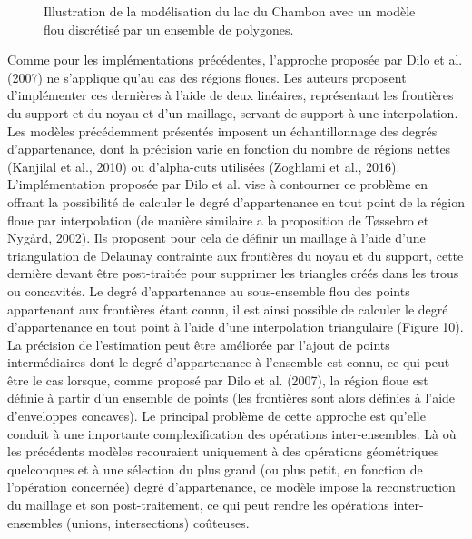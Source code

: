 \begin{figure}
  \centering
  \caption{Illustration de la modélisation du lac du Chambon avec un modèle flou discrétisé par un ensemble de polygones.}
  \label{fig:champ_polygones}
\end{figure}

Comme pour les implémentations précédentes, l’approche proposée par
Dilo et al. (2007) ne s’applique qu’au cas des régions floues. Les
auteurs proposent d’implémenter ces dernières à l’aide de deux
linéaires, représentant les frontières du support et du noyau et d’un
maillage, servant de support à une interpolation. Les modèles
précédemment présentés imposent un échantillonnage des degrés
d’appartenance, dont la précision varie en fonction du nombre de
régions nettes (Kanjilal et al., 2010) ou d’alpha-cuts utilisées
(Zoghlami et al., 2016). L’implémentation proposée par Dilo et
al. vise à contourner ce problème en offrant la possibilité de
calculer le degré d’appartenance en tout point de la région floue par
interpolation (de manière similaire a la proposition de Tøssebro et
Nygård, 2002). Ils proposent pour cela de définir un maillage à l’aide
d’une triangulation de Delaunay contrainte aux frontières du noyau et
du support, cette dernière devant être post-traitée pour supprimer les
triangles créés dans les trous ou concavités. Le degré d’appartenance
au sous-ensemble flou des points appartenant aux frontières étant
connu, il est ainsi possible de calculer le degré d’appartenance en
tout point à l’aide d’une interpolation triangulaire (Figure 10). La
précision de l’estimation peut être améliorée par l’ajout de points
intermédiaires dont le degré d’appartenance à l’ensemble est connu, ce
qui peut être le cas lorsque, comme proposé par Dilo et al. (2007), la
région floue est définie à partir d’un ensemble de points (les
frontières sont alors définies à l’aide d’enveloppes concaves). Le
principal problème de cette approche est qu’elle conduit à une
importante complexification des opérations inter-ensembles. Là où les
précédents modèles recouraient uniquement à des opérations
géométriques quelconques et à une sélection du plus grand (ou plus
petit, en fonction de l’opération concernée) degré d’appartenance, ce
modèle impose la reconstruction du maillage et son post-traitement, ce
qui peut rendre les opérations inter-ensembles (unions, intersections)
coûteuses.

